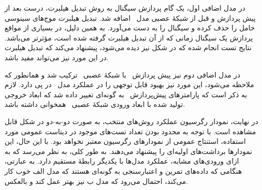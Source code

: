 در مدل اضافی اول، یک گام پردازش سیگنال به روش تبدیل هیلبرت، درست بعد از پیش پردازش و قبل از شبکهٔ عصبی مدل \پ\ اضافه شد. تبدیل هیلبرت موج‌های سینوسی حامل را حذف کرده و  سیگنال را به دست می‌آورد. به همین دلیل، در بسیاری از مواقع پردازش یک سیگنال زمانی که از آن تبدیل هیلبرت گرفته شده است، مؤثرتر می‌باشد. نتایج تست انجام شده که در شکل  نیز دیده می‌شود، پیشنهاد می‌کند که تبدیل هیلبرت در این مورد نیز می‌تواند مفید باشد.

در مدل اضافی دوم نیز پیش پردازش \آ\ با شبکهٔ عصبی \پ\ ترکیب شد و همانطور که ملاحظه می‌شود، این مورد نیز بهبود قابل توجهی را در عملکرد مدل \پ\ در پی دارد. لازم به ذکر است که پارامترهای پیش‌پردازش \آ\ به گونه‌ای تغییر داده شد که ابعاد خروجی تولید شده با ابعاد ورودی شبکهٔ عصبی \پ\ همخوانی داشته باشد.

در نهایت، نمودار رگرسیون عملکرد روش‌های منتخب، به صورت دو-به-دو در شکل  قابل مشاهده است. با توجه به محدود بودن تعداد تست‌های موجود در دیتاست عمومی مورد استفاده، استنتاج عمومی از نمودارهای رگرسیون معتبر نخواهد بود. با این حال، این نمودارها برداشت‌های اولیه‌ای را پیشنهاد می‌دهند. به طور کلی، به نظر می‌رسد که به ازای ورودی‌های مشابه، عملکرد مدل‌ها با یکدیگر رابطهٔ مستقیم دارد. به عبارتی، هنگامی که داده‌های تمرین و اعتبارسنجی به گونه‌ای هستند که مدل الف خوب کار می‌کند، احتمال می‌رود که مدل ب نیز بهتر عمل کند و بالعکس.

